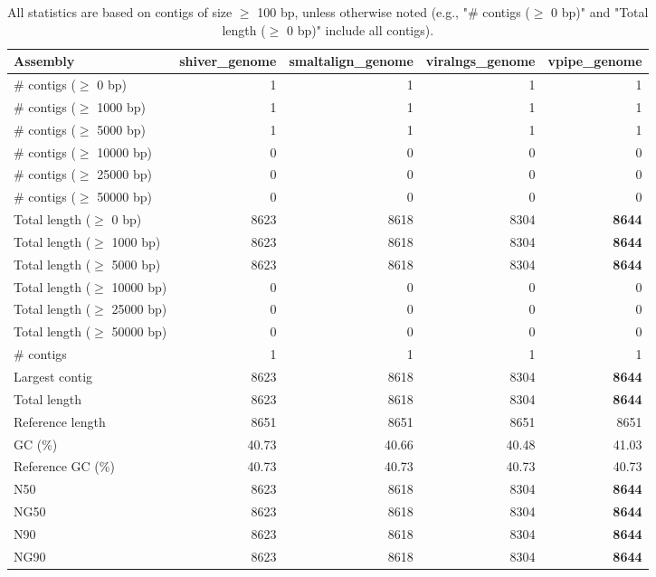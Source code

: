 \documentclass[12pt,a4paper]{article}
\begin{document}
\begin{table}[ht]
\begin{center}
\caption{All statistics are based on contigs of size $\geq$ 100 bp, unless otherwise noted (e.g., "\# contigs ($\geq$ 0 bp)" and "Total length ($\geq$ 0 bp)" include all contigs).}
\begin{tabular}{|l*{4}{|r}|}
\hline
Assembly & shiver\_genome & smaltalign\_genome & viralngs\_genome & vpipe\_genome \\ \hline
\# contigs ($\geq$ 0 bp) & 1 & 1 & 1 & 1 \\ \hline
\# contigs ($\geq$ 1000 bp) & 1 & 1 & 1 & 1 \\ \hline
\# contigs ($\geq$ 5000 bp) & 1 & 1 & 1 & 1 \\ \hline
\# contigs ($\geq$ 10000 bp) & 0 & 0 & 0 & 0 \\ \hline
\# contigs ($\geq$ 25000 bp) & 0 & 0 & 0 & 0 \\ \hline
\# contigs ($\geq$ 50000 bp) & 0 & 0 & 0 & 0 \\ \hline
Total length ($\geq$ 0 bp) & 8623 & 8618 & 8304 & {\bf 8644} \\ \hline
Total length ($\geq$ 1000 bp) & 8623 & 8618 & 8304 & {\bf 8644} \\ \hline
Total length ($\geq$ 5000 bp) & 8623 & 8618 & 8304 & {\bf 8644} \\ \hline
Total length ($\geq$ 10000 bp) & 0 & 0 & 0 & 0 \\ \hline
Total length ($\geq$ 25000 bp) & 0 & 0 & 0 & 0 \\ \hline
Total length ($\geq$ 50000 bp) & 0 & 0 & 0 & 0 \\ \hline
\# contigs & 1 & 1 & 1 & 1 \\ \hline
Largest contig & 8623 & 8618 & 8304 & {\bf 8644} \\ \hline
Total length & 8623 & 8618 & 8304 & {\bf 8644} \\ \hline
Reference length & 8651 & 8651 & 8651 & 8651 \\ \hline
GC (\%) & 40.73 & 40.66 & 40.48 & 41.03 \\ \hline
Reference GC (\%) & 40.73 & 40.73 & 40.73 & 40.73 \\ \hline
N50 & 8623 & 8618 & 8304 & {\bf 8644} \\ \hline
NG50 & 8623 & 8618 & 8304 & {\bf 8644} \\ \hline
N90 & 8623 & 8618 & 8304 & {\bf 8644} \\ \hline
NG90 & 8623 & 8618 & 8304 & {\bf 8644} \\ \hline

\end{tabular}
\end{center}
\end{table}
\end{document}
